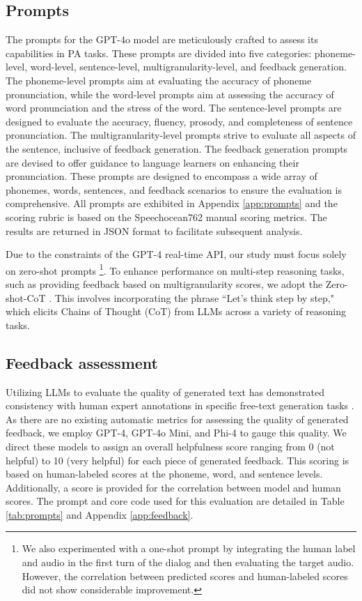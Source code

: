 \documentclass{Interspeech}
\begin{document}
\subsection{Prompts}

The prompts for the GPT-4o model are meticulously crafted to assess its capabilities in PA tasks. These prompts are divided into five categories: phoneme-level, word-level, sentence-level, multigranularity-level, and feedback generation. The phoneme-level prompts aim at evaluating the accuracy of phoneme pronunciation, while the word-level prompts aim at assessing the accuracy of word pronunciation and the stress of the word. The sentence-level prompts are designed to evaluate the accuracy, fluency, prosody, and completeness of sentence pronunciation. The multigranularity-level prompts strive to evaluate all aspects of the sentence, inclusive of feedback generation. The feedback generation prompts are devised to offer guidance to language learners on enhancing their pronunciation. These prompts are designed to encompass a wide array of phonemes, words, sentences, and feedback scenarios to ensure the evaluation is comprehensive. All prompts are exhibited in Appendix \ref{app:prompts} and the scoring rubric is based on the Speechocean762 \cite{zhang2021speechocean762} manual scoring metrics. The results are returned in JSON format to facilitate subsequent analysis.

Due to the constraints of the GPT-4 real-time API, our study must focus solely on zero-shot prompts \footnote{We also experimented with a one-shot prompt by integrating the human label and audio in the first turn of the dialog and then evaluating the target audio. However, the correlation between predicted scores and human-labeled scores did not show considerable improvement.}. To enhance performance on multi-step reasoning tasks, such as providing feedback based on multigranularity scores, we adopt the Zero-shot-CoT \cite{kojima2023largelanguagemodelszeroshot}. This involves incorporating the phrase ``Let's think step by step," which elicits Chains of Thought (CoT) from LLMs across a variety of reasoning tasks.

\subsection{Feedback assessment}

Utilizing LLMs to evaluate the quality of generated text has demonstrated consistency with human expert annotations in specific free-text generation tasks \cite{chiang2023large}. As there are no existing automatic metrics for assessing the quality of generated feedback, we employ GPT-4, GPT-4o Mini, and Phi-4 \cite{microsoft2024phi4technicalreport} to gauge this quality. We direct these models to assign an overall helpfulness score ranging from 0 (not helpful) to 10 (very helpful) for each piece of generated feedback. This scoring is based on human-labeled scores at the phoneme, word, and sentence levels. Additionally, a score is provided for the correlation between model and human scores. The prompt and core code used for this evaluation are detailed in Table \ref{tab:prompts} and Appendix \ref{app:feedback}.
\end{document}
